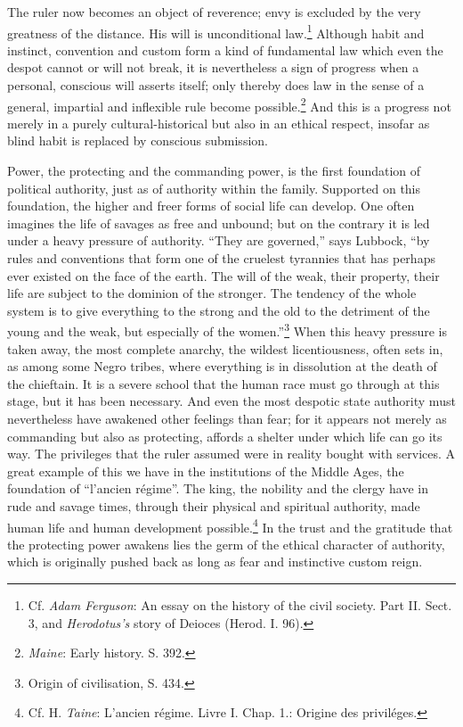 \documentclass[12pt,a4paper,openany]{book}
\newcommand{\opage}[1]{\marginnote{\footnotesize\textit{[#1]}}}
\begin{document}
The ruler now becomes an object of reverence; envy is excluded by the very
greatness of the distance. His will is unconditional law.\footnote[1]{Cf.
\emph{Adam Ferguson}: An essay on the history of the civil society. Part II.
Sect. 3, and \emph{Herodotus's} story of Deioces (Herod. I. 96).} Although
habit and instinct, convention and custom form a kind of fundamental law which
even the despot cannot or will not break, it is nevertheless a sign of
progress when a personal, conscious will asserts itself; only thereby does law
in the sense of a general, impartial and inflexible rule become
possible.\footnote[2]{\emph{Maine}: Early history. S. 392.} And this is a
progress not merely in a purely cultural-historical but also in an ethical
respect, insofar as blind habit is replaced by conscious submission.

\opage{62}Power, the protecting and the commanding power, is the first
foundation of political authority, just as of authority within the family.
Supported on this foundation, the higher and freer forms of social life can
develop. One often imagines the life of savages as free and unbound; but on
the contrary it is led under a heavy pressure of authority. ``They are
governed,'' says Lubbock, ``by rules and conventions that form one of the
cruelest tyrannies that has perhaps ever existed on the face of the earth. The
will of the weak, their property, their life are subject to the dominion of
the stronger. The tendency of the whole system is to give everything to the
strong and the old to the detriment of the young and the weak, but especially
of the women.''\footnote[1]{Origin of civilisation, S. 434.} When this heavy
pressure is taken away, the most complete anarchy, the wildest licentiousness,
often sets in, as among some Negro tribes, where everything is in dissolution
at the death of the chieftain. It is a severe school that the human race must
go through at this stage, but it has been necessary. And even the most
despotic state authority must nevertheless have awakened other feelings than
fear; for it appears not merely as commanding but also as protecting, affords
a shelter under which life can go its way. The privileges that the ruler
assumed were in reality bought with services. A great example of this we have
in the institutions of the Middle Ages, the foundation of ``l'ancien régime''.
The king, the nobility and the clergy have in rude and savage times, through
\opage{63}their physical and spiritual authority, made human life and human
development possible.\footnote[1]{Cf. H. \emph{Taine}: L'ancien régime. Livre
I. Chap. 1.: Origine des priviléges.} In the trust and the gratitude that the
protecting power awakens lies the germ of the ethical character of authority,
which is originally pushed back as long as fear and instinctive custom reign.
\end{document}
